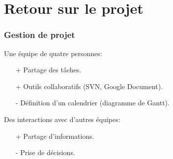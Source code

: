 \section{Retour sur le projet}

\begin{frame}
\frametitle{Gestion de projet}
Une \'equipe de quatre personnes: \\
\begin{itemize}
\item[+] Partage des t\^aches.
\item[+] Outils collaboratifs (SVN, Google Document).
\item[-] D\'efinition d'un calendrier (diagramme de Gantt).
\end{itemize}
\pause
Des interactions avec d'autres \'equipes: \\
\begin{itemize}
\item[+] Partage d'informations.
\item[-] Prise de d\'ecisions.
\end{itemize}
\end{frame}